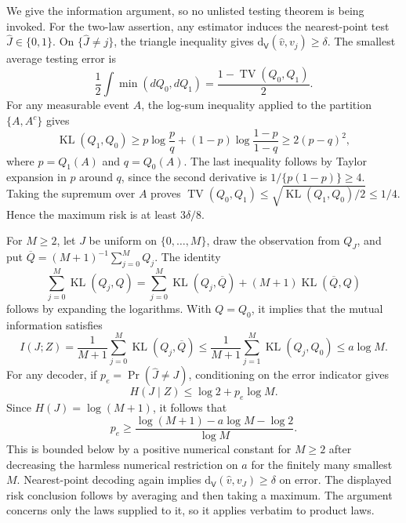 We give the information argument, so no unlisted testing theorem is being invoked. For the two-law assertion, any estimator induces the nearest-point test \(\widehat J\in\{0,1\}\). On \(\{\widehat J\ne j\}\), the triangle inequality gives \(\mathrm d_{\mathsf V}(\widehat v,v_j)\ge\delta\). The smallest average testing error is
\[
 \frac12\int \min(dQ_0,dQ_1)=\frac{1-\operatorname{TV}(Q_0,Q_1)}2.
\]
For any measurable event \(A\), the log-sum inequality applied to the partition \(\{A,A^c\}\) gives
\[
 \operatorname{KL}(Q_1,Q_0)
 \ge p\log\frac pq+(1-p)\log\frac{1-p}{1-q}
 \ge 2(p-q)^2,
\]
where \(p=Q_1(A)\) and \(q=Q_0(A)\). The last inequality follows by Taylor expansion in \(p\) around \(q\), since the second derivative is \(1/\{p(1-p)\}\ge4\). Taking the supremum over \(A\) proves \(\operatorname{TV}(Q_0,Q_1)\le\sqrt{\operatorname{KL}(Q_1,Q_0)/2}\le1/4\). Hence the maximum risk is at least \(3\delta/8\).

For \(M\ge2\), let \(J\) be uniform on \(\{0,\ldots,M\}\), draw the observation from \(Q_J\), and put \(\overline Q=(M+1)^{-1}\sum_{j=0}^M Q_j\). The identity
\[
 \sum_{j=0}^M\operatorname{KL}(Q_j,Q)
 =\sum_{j=0}^M\operatorname{KL}(Q_j,\overline Q)
 +(M+1)\operatorname{KL}(\overline Q,Q)
\]
follows by expanding the logarithms. With \(Q=Q_0\), it implies that the mutual information satisfies
\[
 I(J;Z)=\frac1{M+1}\sum_{j=0}^M\operatorname{KL}(Q_j,\overline Q)
 \le \frac1{M+1}\sum_{j=1}^M\operatorname{KL}(Q_j,Q_0)
 \le a\log M.
\]
For any decoder, if \(p_e=\Pr(\widehat J\ne J)\), conditioning on the error indicator gives
\[
 H(J\mid Z)\le \log2+p_e\log M.
\]
Since \(H(J)=\log(M+1)\), it follows that
\[
 p_e\ge\frac{\log(M+1)-a\log M-\log2}{\log M}.
\]
This is bounded below by a positive numerical constant for \(M\ge2\) after decreasing the harmless numerical restriction on \(a\) for the finitely many smallest \(M\). Nearest-point decoding again implies \(\mathrm d_{\mathsf V}(\widehat v,v_J)\ge\delta\) on error. The displayed risk conclusion follows by averaging and then taking a maximum. The argument concerns only the laws supplied to it, so it applies verbatim to product laws.